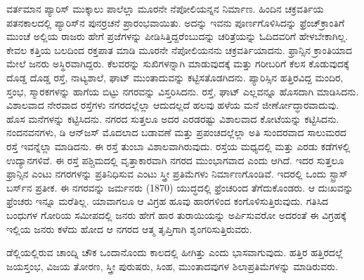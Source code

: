 ವರ್ತಮಾನ ಪ್ಯಾರಿಸ್​ ಮುಕ್ಕಾಲು ಪಾಲೆಲ್ಲಾ ಮೂರನೇ ನೆಪೋಲಿಯನ್ನನ ನಿರ್ಮಾಣ. ಹಿಂದಿನ ಚಕ್ರವರ್ತಿಯ ಪತನಕಾಲದಲ್ಲಿ ಪ್ಯಾರಿಸ್​ನ ಪುನರ್ರಚನೆ ಪ್ರಾರಂಭವಾಯಿತು. ಅದನ್ನು ಇವನು ಪೂರ್ಣಗೊಳಿಸಿದನ್ನು ಫ್ರೆಂಚ್​ ಕ್ರಾಂತಿಗೆ ಮುಂಚೆ ಅಲ್ಲಿಯ ರಾಜರು ಹೇಗೆ ಪ್ರಜೆಗಳನ್ನು ಪೀಡಿಸಿತ್ತಿದ್ದರೆಂಬುದನ್ನು ಚರಿತ್ರೆಯನ್ನು ಓದಿದವರಿಗೆ ಹೇಳಬೇಕಾಗಿಲ್ಲ. ಕೇವಲ ಕತ್ತಿಯ ಬಲದಿಂದ ರಕ್ತಪಾತ ಮಾಡಿ ಮೂರನೇ ನೆಪೋಲಿಯನನು ಚಕ್ರವರ್ತಿಯಾದನು. ಫ್ರಾನ್ಸಿನ ಕ್ರಾಂತಿಯಾದ ಮೇಲೆ ಜನರು ಅಸ್ಥಿರವಾಗಿದ್ದರು. ಕೆಲವರನ್ನು ಸುಖಿಗಳನ್ನಾಗಿ ಮಾಡುವುದಕ್ಕೆ ಮತ್ತು ಗರೀಬರಿಗೆ ಕೆಲಸ ಕೊಡುವುದಕ್ಕೆ ದೊಡ್ಡ ದೊಡ್ಡ ರಸ್ತೆ, ನಾಟ್ಯಶಾಲೆ, ಘಾಟ್​ ಮುಂತಾದುವನ್ನು ಕಟ್ಟಿಸತೊಡಗಿದನು. ಪ್ಯಾರಿಸ್ಸಿನ ಹತ್ತಿರವಿದ್ದ ಮಂದಿರ, ಸ್ತಂಭ, ಸ್ಮಾರಕಗಳನ್ನು ಹಾಗೆಯ ಬಿಟ್ಟು ನಗರವನ್ನು ವಿಸ್ತರಿಸಿದನು. ರಸ್ತೆ, ಘಾಟ್​ ಎಲ್ಲವನ್ನೂ ಹೊಸದಾಗಿ ಮಾಡಿಸಿದನು. ವಿಶಾಲವಾದ ನೇರವಾದ ರಸ್ತೆಗಳು ನಗರದಲ್ಲೆಲ್ಲಾ ಆದುದಲ್ಲದೆ ಹಲವು ಹಳೆಯ ಮನೆ ಜೀರ್ಣೋದ್ಧಾರವಾದುವು. ಹೊಸ ಮನೆಗಳನ್ನು ಕಟ್ಟಿಸಿದನು. ನಗರದ ಸುತ್ತಲೂ ಅದರ ಎರಡರಷ್ಟು ವಿಶಾಲವಾದ ಕೋಟೆಯನ್ನು ಕಟ್ಟಿಸಿದನು. ನಂದನವನಗಳು, ಡಿ ಆನ್​ಜಸ್​ ಮೊದಲಾದ ಬಡಾವಣೆ ಮತ್ತು ಪ್ರಪಂಚದಲ್ಲೆಲ್ಲಾ ಅತಿ ಸುಂದರವಾದ ಸಾಲುಮರದ ರಸ್ತೆ  ಇವನ್ನೆಲ್ಲಾ ಮಾಡಿದನು. ಈ ರಸ್ತೆ ತುಂಬಾ ವಿಶಾಲವಾಗಿರುವುದು. ರಸ್ತೆಯ ಮಧ್ಯದಲ್ಲಿ ಮತ್ತು ಎರಡು ಕಡೆಗಳಲ್ಲಿ ಉದ್ಯಾನಗಳಿವೆ. ಈ ರಸ್ತೆ ಪಶ್ಚಿಮದಲ್ಲಿ ವೃತ್ತಾಕಾರವಾಗಿ ನಗರದ ಮುಂಭಾಗವಾದ  ಎಂದು ಆಗಿದೆ. ಇದರ ಸುತ್ತಲೂ ಫ್ರಾನ್ಸಿನ ಎಂಟು ನಗರಗಳನ್ನು ಪ್ರತಿನಿಧಿಸುವ ಎಂಟು ಸ್ತ್ರೀ ಪ್ರತಿಮೆಗಳು ನಿರ್ಮಾಣಗೊಂಡಿವೆ. ಇದರಲ್ಲಿ ಒಂದು ಸ್ಟ್ರಾಸ್​ ಬರ್ಸ್​ನ ಪ್ರತೀಕ. ಈ ನಗರವನ್ನು ಜರ್ಮನರು (1870) ಯುದ್ಧದಲ್ಲಿ ಫ್ರೆಂಚರಿಂದ ತೆಗೆದುಕೊಂಡರು. ಆ ದುಃಖವನ್ನು ಫ್ರೆಂಚರು ಇನ್ನೂ ಮರೆತಿಲ್ಲ. ಯಾವಾಗಲೂ ಆ ವಿಗ್ರಹ ಹೂವು ಹಾರಗಳಿಂದ ಕಂಗೊಳಿಸುತ್ತಿರುವುದು. ಗತಿಸಿದ ಬಂಧುಗಳ ಗೋರಿಯ ಸಮೀಪದಲ್ಲಿ ಜನರು ಹೇಗೆ ಹಾರ ತುರಾಯಿಯನ್ನು ಅರ್ಪಿಸುವರೋ ಅದರಂತೆ ಈ ವಿಗ್ರಹಕ್ಕೆ ಇಲ್ಲಿಯ ಜನರು ಕಳೆದು ಹೋದ ಆ ನಗರದ ಆತ್ಮ ತೃಪ್ತಿಗಾಗಿ ಶೃಂಗರಿಸುತ್ತಿರುವರು.

\newpage

ಡೆಲ್ಲಿಯಲ್ಲಿರುವ ಚಾಂದ್ನಿ ಚೌಕ ಒಂದಾನೊಂದು ಕಾಲದಲ್ಲಿ ಹೀಗಿತ್ತು ಎಂದು ಭಾಸ\break ವಾಗುವುದು. ಹತ್ತಿರ ಹತ್ತಿರದಲ್ಲೆ ಜಯಸ್ತಂಭ, ವಿಜಯ ತೋರಣ, ಸ್ತ್ರೀ ಪುರುಷರು, ಸಿಂಹ, ಮುಂತಾದವುಗಳ ಶಿಲಾಪ್ರತಿಮೆಗಳನ್ನು ಮಾಡಿರುವರು.

